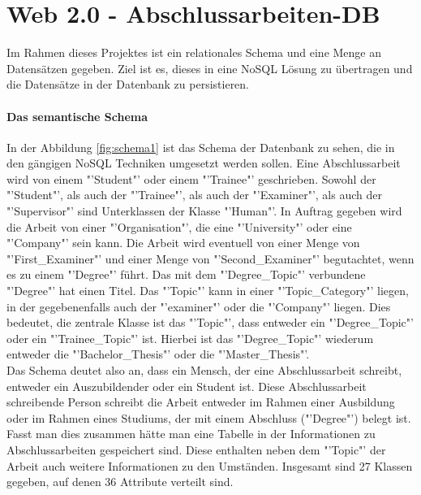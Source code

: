 \section{Web 2.0 - Abschlussarbeiten-DB}
Im Rahmen dieses Projektes ist ein relationales Schema und eine Menge an Datens\"atzen gegeben. Ziel ist es, dieses in eine NoSQL Lösung zu übertragen und die Datens\"atze in der Datenbank zu persistieren.

\paragraph{Das semantische Schema}
In der Abbildung \ref{fig:schema1} ist das Schema der Datenbank zu sehen, die in den g\"angigen NoSQL Techniken umgesetzt werden sollen. Eine Abschlussarbeit wird von einem "'Student"' oder einem "'Trainee"' geschrieben. Sowohl der "'Student"', als auch der "'Trainee"', als auch der "'Examiner"', als auch der "'Supervisor"' sind Unterklassen der Klasse "'Human"'. In Auftrag gegeben wird die Arbeit von einer "'Organisation"', die eine "'University"' oder eine "'Company"' sein kann. Die Arbeit wird eventuell von einer Menge von "'First\_Examiner"' und einer Menge von "'Second\_Examiner"' begutachtet, wenn es zu einem "'Degree"' f\"uhrt. Das mit dem "'Degree\_Topic"' verbundene "'Degree"' hat einen Titel. Das "'Topic"' kann in einer "'Topic\_Category"' liegen, in der gegebenenfalls auch der "'examiner"' oder die "'Company"' liegen. Dies bedeutet, die zentrale Klasse ist das "'Topic"', dass entweder ein "'Degree\_Topic"' oder ein "'Trainee\_Topic"' ist. Hierbei ist das "'Degree\_Topic"' wiederum entweder die "'Bachelor\_Thesis"' oder die "'Master\_Thesis"'.\\

Das Schema deutet also an, dass ein Mensch, der eine Abschlussarbeit schreibt, entweder ein Auszubildender oder ein Student ist. Diese Abschlussarbeit schreibende Person schreibt die Arbeit entweder im Rahmen einer Ausbildung oder im Rahmen eines Studiums, der mit einem Abschluss ("'Degree"') belegt ist. Fasst man dies zusammen h\"atte man eine Tabelle in der Informationen zu Abschlussarbeiten gespeichert sind. Diese enthalten neben dem "'Topic"' der Arbeit auch weitere Informationen zu den Umst\"anden. Insgesamt sind 27 Klassen gegeben, auf denen 36 Attribute verteilt sind.\\

